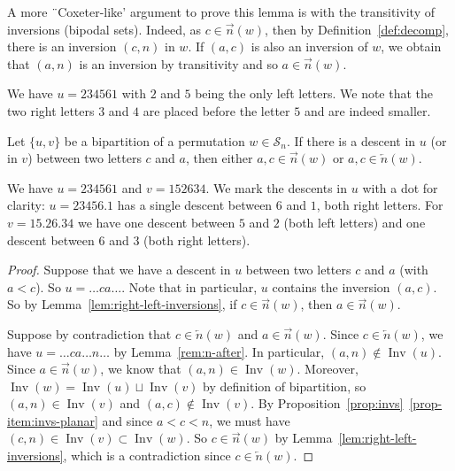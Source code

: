 \documentclass[ALCO,Unicode]{cedram}
\theoremstyle{definition}
\newcommand{\Sym}[1]{\mathcal{S}_{#1}}
\newcommand{\Symn}{\Sym{n}}
\DeclareMathOperator{\invs}{Inv}
\newcommand{\R}{{\overrightarrow{n}}}
\newcommand{\LL}{{\overleftarrow{n}}}
\begin{document}
\begin{remark} A more ¨Coxeter-like' argument to prove this lemma is with the transitivity of inversions (bipodal sets). Indeed, as $c\in\R(w)$, then by Definition~\ref{def:decomp}, there is an inversion $(c,n)$ in $w$. If $(a,c)$ is also an inversion of $w$, we obtain that $(a,n)$ is an inversion by transitivity and so $a\in\R(w)$.   
\end{remark}

\begin{ex}  We have $u = 234561$ with $2$ and $5$ being the only left letters. We note that the two right letters $3$ and $4$ are placed before the letter $5$ and are indeed smaller.
\end{ex}

\begin{prop}
\label{prop:decents}
Let $\lbrace u, v \rbrace$ be a bipartition of a permutation $w \in \Symn$. If there is a descent in $u$ (or in $v$) between two letters $c$ and $a$, then either $a,c\in\R(w)$ or $a,c\in\LL(w)$.
\end{prop} 

\begin{ex}   We have $u = 234561$ and $v = 152634$. We mark the descents in $u$ with a dot for clarity:  $u = 23456.1$ has a single descent between $6$ and $1$, both right letters. For  $v = 15.26.34$ we have one descent between $5$ and $2$ (both left letters) and one descent between $6$ and $3$ (both right letters).
\end{ex}

\begin{proof} Suppose that we have a descent in $u$ between two letters $c$ and $a$ (with $a < c$). So $u=\dots ca\dots$.  Note that in particular, $u$ contains the inversion $(a,c)$. So by Lemma~\ref{lem:right-left-inversions}, if $c\in\R(w)$, then  $a\in\R(w)$.

Suppose by contradiction that $c\in\LL(w)$  and $a\in\R(w)$. Since $c\in\LL(w)$, we have $u=\dots ca \dots n\dots$ by Lemma~\ref{rem:n-after}. In particular, $(a,n) \not\in \invs(u)$. Since $a\in\R(w)$, we know that $(a,n)\in\invs(w)$. Moreover, $\invs(w) = \invs(u) \sqcup \invs(v)$ by definition of bipartition, so $(a,n) \in \invs(v)$ and $(a,c)\notin\invs(v)$.  By Proposition~\ref{prop:invs}~\eqref{prop-item:invs-planar} and since $a < c < n$, we must have  $(c,n) \in \invs(v) \subset \invs(w)$. So $c\in\R(w)$ by Lemma~\ref{lem:right-left-inversions},   which is a contradiction since $c\in\LL(w)$.
\end{proof}
\end{document}
